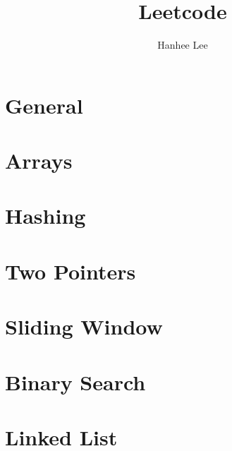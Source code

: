 \documentclass{article}
\title{Leetcode}
\author{Hanhee Lee}
\begin{document}
\section{General}

\newpage

\section{Arrays}

\newpage

\section{Hashing}

\newpage

\section{Two Pointers}

\newpage

\section{Sliding Window}

\newpage

\section{Binary Search}

\newpage

\section{Linked List}

\end{document}
